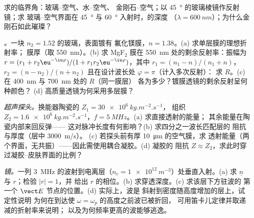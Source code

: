 \begin{exercise}[$\star$]\label{exo:b2:wave-interfaces:4}
求的临界角：玻璃–空气、水–空气、
金刚石–空气；以 \qty{45}{\degree} 的玻璃棱镜作反射镜；求
玻璃–空气界面在 \qty{45}{\degree} 与 \qty{60}{\degree} 入射时，的深度
（$\lambda = \qty{600}{nm}$）；为什么金刚石如此璀璨？
\end{exercise}

\begin{exercise}[$\star\star$]\label{exo:b2:wave-interfaces:5}
\emph{。}一块 $n_2 = 1.52$ 的玻璃，表面镀有
氟化镁膜，$n = 1.38$。(a) 求单层膜的理想折射率；
膜厚（取 \qty{550}{nm}）。(b) 求 MgF$_2$ 膜在
\qty{550}{nm} 处的剩余反射率：振幅为 $r = (r_1 + r_2\eu^{-\iu\varphi})/(1 + r_1r_2
\eu^{-\iu\varphi})$，其中 $r_1 = (n_1 - n)/(n_1 + n)$，$r_2 = (n - n_2)/(n + n_2)$
且在设计波长处 $\varphi = \pi$（计入多次反射）：
求 $R$。(c) 在 \qty{400}{nm} 与 \qty{700}{nm} 处的 $R$（同一膜层）
各为多少？镀膜透镜的剩余反射呈何种颜色？
(d) 高质量透镜为何采用多层膜？
\end{exercise}

\begin{exercise}[$\star\star$]\label{exo:b2:wave-interfaces:6}
\emph{超声探头。}换能器陶瓷的 $Z_1 = \qty{30e6}{kg.m^{-2}.s^{-1}}$，
组织 $Z_2 = \qty{1.6e6}{kg.m^{-2}.s^{-1}}$，$f = \qty{5}{MHz}$。(a) 求直接透射的能量；
其余能量在陶瓷内部来回反弹——
这对脉冲长度有何影响？(b) 求四分之一波长匹配层的
阻抗与厚度（层中 \qty{3000}{m/s}）。
(c) 若探头前有厚 \qty{10}{\micro m} 的空气膜，求
透射能量（两个界面，无共振）——因此需使用耦合凝胶。(d) 凝胶的
阻抗 $Z \approx Z_2$，求此时穿过凝胶–皮肤界面的比例？
\end{exercise}

\begin{exercise}[$\star\star$]\label{exo:b2:wave-interfaces:7}
\emph{镜。}一列 \qty{3}{MHz} 的波射到电离层（$n_e =
\qty{1e12}{m^{-3}}$）处垂直入射。(a) 求 $\underline n$ 与 $r$；检验 $|r| = 1$，并
给出 $r$ 的相位。(b) 求穿透深度。(c) 求该层下方驻波的
第一个 $\vect E$ 节点的位置。(d) 实际上，波是
斜射到密度随高度增加的层上，试定性说明
为何在到达使 $\omega = \omega_p$ 的高度之前波已被折回，
可用笛卡儿定律并取递减的折射率来说明；
以及为何频率更高的波能够逃逸。
\end{exercise}

